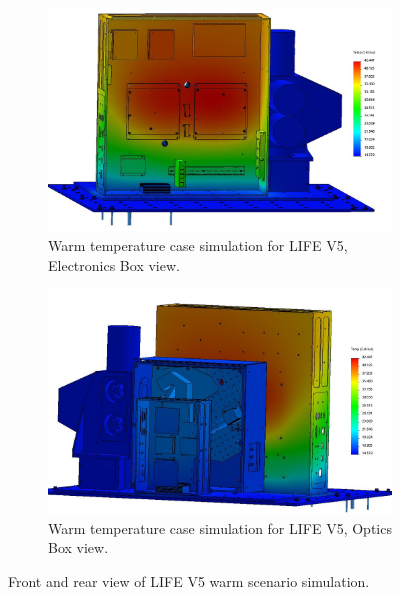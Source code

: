 \begin{figure}
    \centering
    \begin{subfigure}[h]{0.9\textwidth}
        \centering
        \includegraphics[width=\textwidth]{chap3_images/LIFE_V5_initial_images/Iteration_3_ebox_no_labels.JPG}
        \caption{Warm temperature case simulation for LIFE V5, Electronics Box view.}
        \label{fig:LIFE_V5_TA_WARM_EBOX}
    \end{subfigure}
    \begin{subfigure}[h]{0.9\textwidth}
        \centering
        \includegraphics[width=\textwidth]{chap3_images/LIFE_V5_initial_images/Iteration_3_no_labels.JPG}
        \caption{Warm temperature case simulation for LIFE V5, Optics Box view.}
        \label{fig:LIFE_V4_TA_WARM_OBOX}
    \end{subfigure}
    \caption{Front and rear view of LIFE V5 warm scenario simulation.}
    \label{LIFE_V5_Prelim_TA_WARM}
\end{figure}

